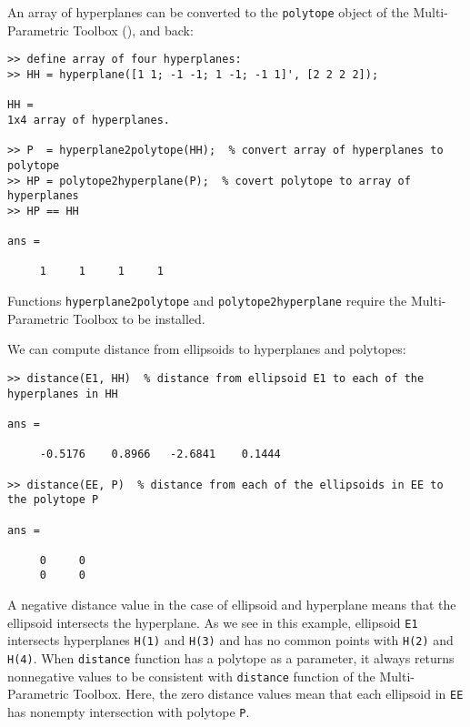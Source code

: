 An array of hyperplanes can be converted to the {\tt polytope} object of the
Multi-Parametric Toolbox (\cite{morari04, mpt}), and back:
{\tt \begin{verbatim}
>> define array of four hyperplanes:
>> HH = hyperplane([1 1; -1 -1; 1 -1; -1 1]', [2 2 2 2]);

HH =
1x4 array of hyperplanes.

>> P  = hyperplane2polytope(HH);  % convert array of hyperplanes to polytope
>> HP = polytope2hyperplane(P);  % covert polytope to array of hyperplanes
>> HP == HH

ans =

     1     1     1     1
\end{verbatim} }
Functions {\tt hyperplane2polytope} and {\tt polytope2hyperplane} require
the Multi-Parametric Toolbox to be installed.

We can compute distance from ellipsoids to hyperplanes and polytopes:
{\tt \begin{verbatim}
>> distance(E1, HH)  % distance from ellipsoid E1 to each of the hyperplanes in HH

ans =

     -0.5176    0.8966   -2.6841    0.1444

>> distance(EE, P)  % distance from each of the ellipsoids in EE to the polytope P

ans =

     0     0
     0     0
\end{verbatim} }
A negative distance value in the case of ellipsoid and hyperplane means that
the ellipsoid intersects the hyperplane. As we see in this example, ellipsoid
{\tt E1} intersects  hyperplanes {\tt H(1)} and {\tt H(3)} and has
no common points with {\tt H(2)} and {\tt H(4)}. When {\tt distance} function
has a polytope as a parameter, it always returns nonnegative values to be
consistent with {\tt distance} function of the Multi-Parametric Toolbox.
Here, the zero distance values mean that each ellipsoid in {\tt EE} has
nonempty intersection with polytope {\tt P}.

